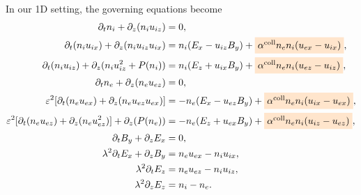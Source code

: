 \documentclass{report}
\begin{document}
In our 1D setting, the governing equations become
\begin{align*}
    \partial_t n_i + \partial_z(n_i u_{iz}) &= 0, \\
    \partial_t(n_i u_{ix}) + \partial_z(n_i u_{iz} u_{ix}) &= n_i(E_x - u_{iz} B_y) + \colorbox{orange!20}{$\alpha^\text{coll} n_e n_i (u_{ex} - u_{ix})$}, \\
    \partial_t(n_i u_{iz}) + \partial_z(n_i u_{iz}^2 + P(n_i)) &= n_i(E_z + u_{ix} B_y) + \colorbox{orange!20}{$\alpha^\text{coll} n_e n_i (u_{ez} - u_{iz})$}, \\
    \partial_t n_e + \partial_z(n_e u_{ez}) &= 0, \\
    \varepsilon^2 [ \partial_t(n_e u_{ex}) + \partial_z(n_e u_{ez} u_{ex}) ] &= - n_e(E_x - u_{ez} B_y) + \colorbox{orange!20}{$\alpha^\text{coll} n_e n_i (u_{ix} - u_{ex})$}, \\
    \varepsilon^2 [ \partial_t(n_e u_{ez}) + \partial_z(n_e u_{ez}^2) ] + \partial_z(P(n_e)) &= -n_e(E_z + u_{ex} B_y) + \colorbox{orange!20}{$\alpha^\text{coll} n_e n_i (u_{iz} - u_{ez})$}, \\
    \partial_t B_y + \partial_z E_x &= 0, \\
    \lambda^2 \partial_t E_x + \partial_z B_y &= n_e u_{ex} - n_i u_{ix}, \\
    \lambda^2 \partial_t E_z &= n_e u_{ez} - n_i u_{iz}, \\
    \lambda^2 \partial_z E_z &= n_i - n_e.
\end{align*}
\end{document}
